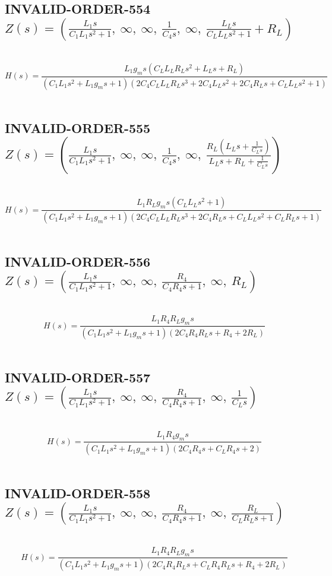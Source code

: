 \documentclass{article}
\begin{document}
\subsection{INVALID-ORDER-554 $Z(s) = \left( \frac{L_{1} s}{C_{1} L_{1} s^{2} + 1}, \  \infty, \  \infty, \  \frac{1}{C_{4} s}, \  \infty, \  \frac{L_{L} s}{C_{L} L_{L} s^{2} + 1} + R_{L}\right)$ } \ 
\textbf{\[H(s) = \frac{L_{1} g_{m} s \left(C_{L} L_{L} R_{L} s^{2} + L_{L} s + R_{L}\right)}{\left(C_{1} L_{1} s^{2} + L_{1} g_{m} s + 1\right) \left(2 C_{4} C_{L} L_{L} R_{L} s^{3} + 2 C_{4} L_{L} s^{2} + 2 C_{4} R_{L} s + C_{L} L_{L} s^{2} + 1\right)}\] } \ 
\subsection{INVALID-ORDER-555 $Z(s) = \left( \frac{L_{1} s}{C_{1} L_{1} s^{2} + 1}, \  \infty, \  \infty, \  \frac{1}{C_{4} s}, \  \infty, \  \frac{R_{L} \left(L_{L} s + \frac{1}{C_{L} s}\right)}{L_{L} s + R_{L} + \frac{1}{C_{L} s}}\right)$ } \ 
\textbf{\[H(s) = \frac{L_{1} R_{L} g_{m} s \left(C_{L} L_{L} s^{2} + 1\right)}{\left(C_{1} L_{1} s^{2} + L_{1} g_{m} s + 1\right) \left(2 C_{4} C_{L} L_{L} R_{L} s^{3} + 2 C_{4} R_{L} s + C_{L} L_{L} s^{2} + C_{L} R_{L} s + 1\right)}\] } \ 
\subsection{INVALID-ORDER-556 $Z(s) = \left( \frac{L_{1} s}{C_{1} L_{1} s^{2} + 1}, \  \infty, \  \infty, \  \frac{R_{4}}{C_{4} R_{4} s + 1}, \  \infty, \  R_{L}\right)$ } \ 
\textbf{\[H(s) = \frac{L_{1} R_{4} R_{L} g_{m} s}{\left(C_{1} L_{1} s^{2} + L_{1} g_{m} s + 1\right) \left(2 C_{4} R_{4} R_{L} s + R_{4} + 2 R_{L}\right)}\] } \ 
\subsection{INVALID-ORDER-557 $Z(s) = \left( \frac{L_{1} s}{C_{1} L_{1} s^{2} + 1}, \  \infty, \  \infty, \  \frac{R_{4}}{C_{4} R_{4} s + 1}, \  \infty, \  \frac{1}{C_{L} s}\right)$ } \ 
\textbf{\[H(s) = \frac{L_{1} R_{4} g_{m} s}{\left(C_{1} L_{1} s^{2} + L_{1} g_{m} s + 1\right) \left(2 C_{4} R_{4} s + C_{L} R_{4} s + 2\right)}\] } \ 
\subsection{INVALID-ORDER-558 $Z(s) = \left( \frac{L_{1} s}{C_{1} L_{1} s^{2} + 1}, \  \infty, \  \infty, \  \frac{R_{4}}{C_{4} R_{4} s + 1}, \  \infty, \  \frac{R_{L}}{C_{L} R_{L} s + 1}\right)$ } \ 
\textbf{\[H(s) = \frac{L_{1} R_{4} R_{L} g_{m} s}{\left(C_{1} L_{1} s^{2} + L_{1} g_{m} s + 1\right) \left(2 C_{4} R_{4} R_{L} s + C_{L} R_{4} R_{L} s + R_{4} + 2 R_{L}\right)}\] } \ 
\end{document}

